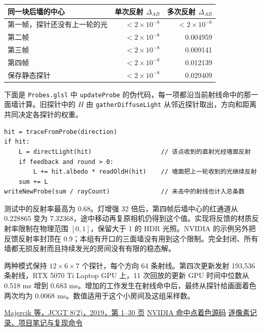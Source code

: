\begin{center}\begin{tabular}{lrr}
\toprule
同一块后墙的中心 & 单次反射 $\Delta_{AB}$ & 多次反射 $\Delta_{AB}$\\
\midrule
第一帧，探针还没有上一轮的光 & $<2\times10^{-8}$ & $<2\times10^{-8}$\\
第二帧 & $<2\times10^{-8}$ & 0.004959\\
第三帧 & $<2\times10^{-8}$ & 0.009141\\
第四帧 & $<2\times10^{-8}$ & 0.012139\\
保存静态探针 & $<2\times10^{-8}$ & 0.029409\\
\bottomrule
\end{tabular}\end{center}

下面是 \verb|Probes.glsl| 中 \verb|updateProbe| 的伪代码，每一项都沿当前射线命中的那一面墙计算。旧探针中的 $H$ 由 \verb|gatherDiffuseLight| 从邻近探针取出，方向和距离共同决定各探针的权重。
\begin{verbatim}
hit = traceFromProbe(direction)
if hit:
    L = directLight(hit)                   // 该点收到的直射光经墙面反射
    if feedback and round > 0:
        L += hit.albedo * readOldH(hit)    // 墙面把上一轮收到的光继续反射
    sum += L
writeNewProbe(sum / rayCount)              // 未击中的射线也计入总条数
\end{verbatim}

测试中的反射率最高为 0.68。灯增强 32 倍后，第四帧后墙中心的红通道从 0.228865 变为 7.32368，途中移动再复原相机仍得到这个值。实现将反馈的材质反射率限制在物理范围 $[0,1]$，保留大于 1 的 HDR 光照。NVIDIA 的示例另外把反馈反射率封顶在 0.9；本组有开口的三面墙没有用到这个限制。完全封闭、所有墙都无损反射而且持续发光的房间没有有限的稳态解。

两种模式保持 $12\times6\times7$ 个探针，每个方向 64 条射线。第四次更新发射 193,536 条射线，RTX 5070 Ti Laptop GPU 上，11 次回放的更新 GPU 时间中位数从 0.518 ms 增到 0.683 ms。增加的工作发生在射线命中后，最终从探针给画面着色两次均为 0.0068 ms。数值适用于这个小房间及这组采样数。

{\small \href{https://jcgt.org/published/0008/02/01/}{Majercik 等，JCGT 8(2)，2019，第 1–30 页}\quad
\href{https://github.com/NVIDIAGameWorks/RTXGI-DDGI/blob/f33e496ca31b3f0eec1c4e2cbaa8bb620e337fa6/samples/test-harness/shaders/ddgi/ProbeTraceRGS.hlsl\#L146-L180}{NVIDIA 命中点着色源码}\quad
\href{run:../profiling/probe-feedback/README.md}{逐像素记录、项目笔记与复现命令}}

